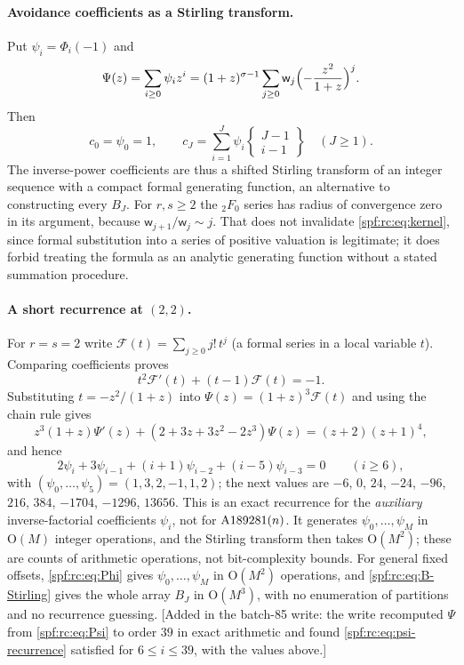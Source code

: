 \documentclass[11pt]{article}
\numberwithin{equation}{section}
\theoremstyle{definition}
\theoremstyle{remark}
\theoremstyle{definition}
\newcommand{\Aone}{\textnormal{A189281}}
\newcommand{\bigO}{\mathrm O}
\newcommand{\rcw}{\mathsf w}
\newcommand{\Stir}[2]{\left\{\begin{matrix}#1\\#2\end{matrix}\right\}}
\begin{document}
\paragraph{Avoidance coefficients as a Stirling transform.} Put
$\psi_i=\Phi_i(-1)$ and
\begin{equation}
 \Psi(z)=\sum_{i\ge0}\psi_iz^i
   =(1+z)^{\sigma-1}\sum_{j\ge0}\rcw_j\Bigl(-\frac{z^2}{1+z}\Bigr)^j.
 \label{spf:rc:eq:Psi}
\end{equation}
Then
\begin{equation}
 c_0=\psi_0=1,\qquad c_J=\sum_{i=1}^J\psi_i\Stir{J-1}{i-1}\quad(J\ge1).
 \label{spf:rc:eq:c-Stirling}
\end{equation}
The inverse-power coefficients are thus a shifted Stirling transform of an
integer sequence with a compact formal generating function, an alternative
to constructing every $B_J$. For $r,s\ge2$ the ${}_2F_0$ series has radius
of convergence zero in its argument, because $\rcw_{j+1}/\rcw_j\sim j$. That
does not invalidate \eqref{spf:rc:eq:kernel}, since formal substitution into
a series of positive valuation is legitimate; it does forbid treating the
formula as an analytic generating function without a stated summation
procedure.

\paragraph{A short recurrence at $(2,2)$.} For $r=s=2$ write
$\mathcal F(t)=\sum_{j\ge0}j!\,t^j$ (a formal series in a local variable
$t$). Comparing coefficients proves
\begin{equation}
 t^2\mathcal F'(t)+(t-1)\mathcal F(t)=-1.
 \label{spf:rc:eq:Euler-series}
\end{equation}
Substituting $t=-z^2/(1+z)$ into $\Psi(z)=(1+z)^3\mathcal F(t)$ and using the
chain rule gives
\begin{equation}
 z^3(1+z)\Psi'(z)+(2+3z+3z^2-2z^3)\Psi(z)=(z+2)(z+1)^4,
 \label{spf:rc:eq:Psi-ode}
\end{equation}
and hence
\begin{equation}
 \boxed{2\psi_i+3\psi_{i-1}+(i+1)\psi_{i-2}+(i-5)\psi_{i-3}=0
              \qquad(i\ge6),}
 \label{spf:rc:eq:psi-recurrence}
\end{equation}
with $(\psi_0,\ldots,\psi_5)=(1,3,2,-1,1,2)$; the next values are
$-6$, $0$, $24$, $-24$, $-96$, $216$, $384$, $-1704$, $-1296$, $13656$. This is an exact recurrence for
the \emph{auxiliary} inverse-factorial coefficients $\psi_i$, not for
$\Aone(n)$. It generates $\psi_0,\ldots,\psi_M$ in $\bigO(M)$ integer
operations, and the Stirling transform then takes $\bigO(M^2)$; these are
counts of arithmetic operations, not bit-complexity bounds. For general
fixed offsets, \eqref{spf:rc:eq:Phi} gives $\psi_0,\ldots,\psi_M$ in
$\bigO(M^2)$ operations, and \eqref{spf:rc:eq:B-Stirling} gives the whole
array $B_J$ in $\bigO(M^3)$, with no enumeration of partitions and no
recurrence guessing. [Added in the batch-85 write: the write recomputed
$\Psi$ from \eqref{spf:rc:eq:Psi} to order $39$ in exact arithmetic and found
\eqref{spf:rc:eq:psi-recurrence} satisfied for $6\le i\le39$, with the
values above.]
\end{document}
